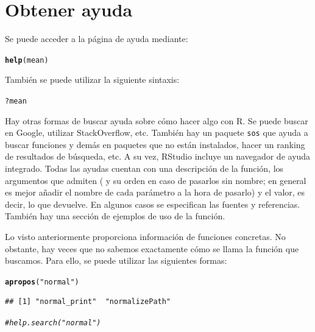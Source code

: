 \documentclass{config/apuntes}\usepackage[]{graphicx}\usepackage[]{xcolor}
\makeatletter
\newcommand{\hlsng}[1]{\textcolor[rgb]{0.192,0.494,0.8}{#1}}%
\newcommand{\hlcom}[1]{\textcolor[rgb]{0.678,0.584,0.686}{\textit{#1}}}%
\newcommand{\hlopt}[1]{\textcolor[rgb]{0,0,0}{#1}}%
\newcommand{\hldef}[1]{\textcolor[rgb]{0.345,0.345,0.345}{#1}}%
\newcommand{\hlkwd}[1]{\textcolor[rgb]{0.737,0.353,0.396}{\textbf{#1}}}%
\newenvironment{kframe}{%
 \def\at@end@of@kframe{}%
 \ifinner\ifhmode%
  \def\at@end@of@kframe{\end{minipage}}%
  \begin{minipage}{\columnwidth}%
 \fi\fi%
 \def\FrameCommand##1{\hskip\@totalleftmargin \hskip-\fboxsep
 \colorbox{shadecolor}{##1}\hskip-\fboxsep
     \hskip-\linewidth \hskip-\@totalleftmargin \hskip\columnwidth}%
 \MakeFramed {\advance\hsize-\width
   \@totalleftmargin\z@ \linewidth\hsize
   \@setminipage}}%
 {\par\unskip\endMakeFramed%
 \at@end@of@kframe}
\newenvironment{knitrout}{}{} %
\newcommand{\code}[1]{\texttt{#1}}
\makeatother
\begin{document}
\section{Obtener ayuda}
Se puede acceder a la página de ayuda mediante:
\begin{knitrout}
\color{fgcolor}\begin{kframe}
\begin{alltt}
\hlkwd{help}\hldef{(mean)}
\end{alltt}
\end{kframe}
\end{knitrout}

También se puede utilizar la siguiente sintaxis:
\begin{knitrout}
\color{fgcolor}\begin{kframe}
\begin{alltt}
\hlopt{?}\hldef{mean}
\end{alltt}
\end{kframe}
\end{knitrout}

Hay otras formas de buscar ayuda sobre cómo hacer algo con R. Se puede buscar en Google, utilizar StackOverflow, etc. También hay un paquete \code{sos} que ayuda a buscar funciones y demás en paquetes que no están instalados, hacer un ranking de resultados de búsqueda, etc. A su vez, RStudio incluye un navegador de ayuda integrado. Todas las ayudas cuentan con una descripción de la función, los argumentos que admiten ( y su orden en caso de pasarlos sin nombre; en general es mejor añadir el nombre de cada parámetro a la hora de pasarlo) y el valor, es decir, lo que devuelve. En algunos casos se especifican las fuentes y referencias. También hay una sección de ejemplos de uso de la función.

Lo visto anteriormente proporciona información de funciones concretas. No obstante, hay veces que no sabemos exactamente cómo se llama la función que buscamos. Para ello, se puede utilizar las siguientes formas:
\begin{knitrout}
\color{fgcolor}\begin{kframe}
\begin{alltt}
\hlkwd{apropos}\hldef{(}\hlsng{"normal"}\hldef{)}
\end{alltt}
\begin{verbatim}
## [1] "normal_print"  "normalizePath"
\end{verbatim}
\begin{alltt}
\hlcom{# help.search("normal")}
\end{alltt}
\end{kframe}
\end{knitrout}
\end{document}
